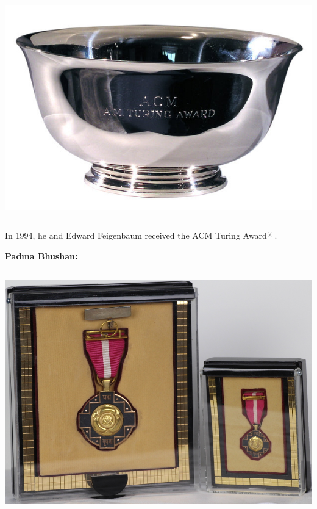 \documentclass{beamer}
\begin{document}
\begin{frame}[allowframebreaks]
\begin{columns}
     \begin{column}{0.45\textwidth}
     \includegraphics[scale=0.2125]{turing_bowl.jpg}
     \end{column}
    \end{columns} 
    
     In 1994, he and Edward Feigenbaum received the ACM Turing Award$^{\tiny\cite{7}}$.
     \framebreak
     
    {\bf Padma Bhushan:}
    \begin{columns}
     \begin{column}{0.5\textwidth}
      \begin{center}
       \includegraphics[scale=0.13]{rajpb.JPG}
      \end{center}
      \end{column}
      

\end{columns}
\end{frame}
\end{document}
